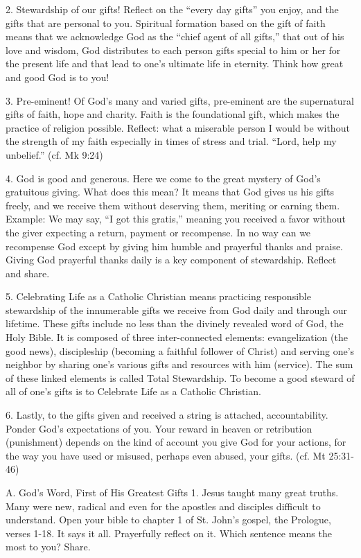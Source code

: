 \documentclass[oneside]{book}
\begin{document}
2. Stewardship of our gifts! Reflect on the ``every day gifts'' you enjoy, and
the gifts that are personal to you. Spiritual formation based on the gift of
faith means that we acknowledge God as the ``chief agent of all gifts,'' that
out of his love and wisdom, God distributes to each person gifts special to him
or her for the present life and that lead to one's ultimate life in
eternity. Think how great and good God is to you!

3. Pre-eminent! Of God's many and varied gifts, pre-eminent are the supernatural
gifts of faith, hope and charity. Faith is the foundational gift, which makes
the practice of religion possible. Reflect: what a miserable person I would be
without the strength of my faith especially in times of stress and
trial. ``Lord, help my unbelief.'' (cf. Mk 9:24)

4. God is good and generous. Here we come to the great mystery of God's
gratuitous giving. What does this mean? It means that God gives us his gifts
freely, and we receive them without deserving them, meriting or earning
them. Example: We may say, ``I got this gratis,'' meaning you received a favor
without the giver expecting a return, payment or recompense. In no way can we
recompense God except by giving him humble and prayerful thanks and
praise. Giving God prayerful thanks daily is a key component of
stewardship. Reflect and share.

5. Celebrating Life as a Catholic Christian means practicing responsible
stewardship of the innumerable gifts we receive from God daily and through our
lifetime. These gifts include no less than the divinely revealed word of God,
the Holy Bible. It is composed of three inter-connected elements: evangelization
(the good news), discipleship (becoming a faithful follower of Christ) and
serving one's neighbor by sharing one's various gifts and resources with him
(service). The sum of these linked elements is called Total Stewardship. To
become a good steward of all of one's gifts is to Celebrate Life as a Catholic
Christian.

6. Lastly, to the gifts given and received a string is attached,
accountability. Ponder God's expectations of you. Your reward in heaven or
retribution (punishment) depends on the kind of account you give God for your
actions, for the way you have used or misused, perhaps even abused, your
gifts. (cf. Mt 25:31-46)

A. God's Word, First of His Greatest Gifts
1. Jesus taught many great truths. Many were new, radical and even for the
apostles and disciples difficult to understand. Open your bible to chapter 1 of
St. John's gospel, the Prologue, verses 1-18. It says it all. Prayerfully
reflect on it. Which sentence means the most to you? Share.
\end{document}
